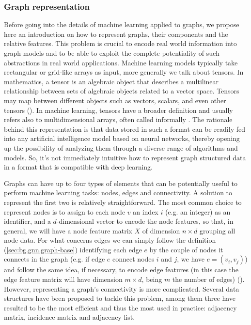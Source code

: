 \documentclass[binding=0.6cm]{sapthesis}
\newcommand{\mycite}[1]{(\cite{#1})}
\begin{document}
\subsubsection{Graph representation}
\label{sec:bg.gnn.graph-repr}
Before going into the details of machine learning applied to graphs, we propose here an introduction on how to represent graphs, their components and the relative features. This problem is crucial to encode real world information into graph models and to be able to exploit the complete potentiality of such abstractions in real world applications. Machine learning models typically take rectangular or grid-like arrays as input, more generally we talk about tensors. In mathematics, a tensor is an algebraic object that describes a multilinear relationship between sets of algebraic objects related to a vector space. Tensors may map between different objects such as vectors, scalars, and even other tensors \mycite{Vasilescu2009AM}. In machine learning, tensors have a broader definition and usually refers also to multidimensional arrays, often called informally . The rationale behind this representation is that data stored in such a format can be readily fed into any artificial intelligence model based on neural networks, thereby opening up the possibility of analyzing them through a diverse range of algorithms and models. So, it’s not immediately intuitive how to represent graph structured data in a format that is compatible with deep learning.

Graphs can have up to four types of elements that can be potentially useful to perform machine learning tasks: nodes, edges and connectivity. A solution to represent the first two is relatively straightforward. The most common choice to represent nodes is to assign to each node $v$ an index $i$ (e.g. an integer) as an identifier, and a $d$-dimensional vector to encode the node features, so that, in general, we will have a node feature matrix $X$ of dimension ${n \times d}$ grouping all node data. For what concerns edges we can simply follow the definition (\cref{sec:bg.gnn.graph-base}) identifying each edge $e$ by the couple of nodes it connects in the graph (e.g. if edge $e$ connect nodes $i$ and $j$, we have $e = (v_i,v_j)$) and follow the same idea, if necessary, to encode edge features (in this case the edge feature matrix will have dimension $m \times d$, being $m$ the number of edges) \mycite{cormen2022introduction}. However, representing a graph’s connectivity is more complicated. Several data structures have been proposed to tackle this problem, among them three have resulted to be the most efficient and thus the most used in practice: adjacency matrix, incidence matrix and adjacency list.
\end{document}

